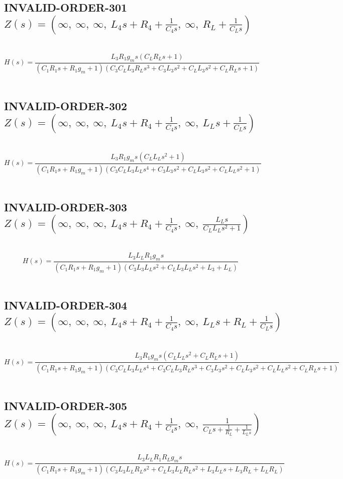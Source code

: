 \documentclass{article}
\begin{document}
\subsection{INVALID-ORDER-301 $Z(s) = \left( \infty, \  \infty, \  \infty, \  L_{4} s + R_{4} + \frac{1}{C_{4} s}, \  \infty, \  R_{L} + \frac{1}{C_{L} s}\right)$ } \ 
\textbf{\[H(s) = \frac{L_{3} R_{1} g_{m} s \left(C_{L} R_{L} s + 1\right)}{\left(C_{1} R_{1} s + R_{1} g_{m} + 1\right) \left(C_{3} C_{L} L_{3} R_{L} s^{3} + C_{3} L_{3} s^{2} + C_{L} L_{3} s^{2} + C_{L} R_{L} s + 1\right)}\] } \ 
\subsection{INVALID-ORDER-302 $Z(s) = \left( \infty, \  \infty, \  \infty, \  L_{4} s + R_{4} + \frac{1}{C_{4} s}, \  \infty, \  L_{L} s + \frac{1}{C_{L} s}\right)$ } \ 
\textbf{\[H(s) = \frac{L_{3} R_{1} g_{m} s \left(C_{L} L_{L} s^{2} + 1\right)}{\left(C_{1} R_{1} s + R_{1} g_{m} + 1\right) \left(C_{3} C_{L} L_{3} L_{L} s^{4} + C_{3} L_{3} s^{2} + C_{L} L_{3} s^{2} + C_{L} L_{L} s^{2} + 1\right)}\] } \ 
\subsection{INVALID-ORDER-303 $Z(s) = \left( \infty, \  \infty, \  \infty, \  L_{4} s + R_{4} + \frac{1}{C_{4} s}, \  \infty, \  \frac{L_{L} s}{C_{L} L_{L} s^{2} + 1}\right)$ } \ 
\textbf{\[H(s) = \frac{L_{3} L_{L} R_{1} g_{m} s}{\left(C_{1} R_{1} s + R_{1} g_{m} + 1\right) \left(C_{3} L_{3} L_{L} s^{2} + C_{L} L_{3} L_{L} s^{2} + L_{3} + L_{L}\right)}\] } \ 
\subsection{INVALID-ORDER-304 $Z(s) = \left( \infty, \  \infty, \  \infty, \  L_{4} s + R_{4} + \frac{1}{C_{4} s}, \  \infty, \  L_{L} s + R_{L} + \frac{1}{C_{L} s}\right)$ } \ 
\textbf{\[H(s) = \frac{L_{3} R_{1} g_{m} s \left(C_{L} L_{L} s^{2} + C_{L} R_{L} s + 1\right)}{\left(C_{1} R_{1} s + R_{1} g_{m} + 1\right) \left(C_{3} C_{L} L_{3} L_{L} s^{4} + C_{3} C_{L} L_{3} R_{L} s^{3} + C_{3} L_{3} s^{2} + C_{L} L_{3} s^{2} + C_{L} L_{L} s^{2} + C_{L} R_{L} s + 1\right)}\] } \ 
\subsection{INVALID-ORDER-305 $Z(s) = \left( \infty, \  \infty, \  \infty, \  L_{4} s + R_{4} + \frac{1}{C_{4} s}, \  \infty, \  \frac{1}{C_{L} s + \frac{1}{R_{L}} + \frac{1}{L_{L} s}}\right)$ } \ 
\textbf{\[H(s) = \frac{L_{3} L_{L} R_{1} R_{L} g_{m} s}{\left(C_{1} R_{1} s + R_{1} g_{m} + 1\right) \left(C_{3} L_{3} L_{L} R_{L} s^{2} + C_{L} L_{3} L_{L} R_{L} s^{2} + L_{3} L_{L} s + L_{3} R_{L} + L_{L} R_{L}\right)}\] } \ 
\end{document}
